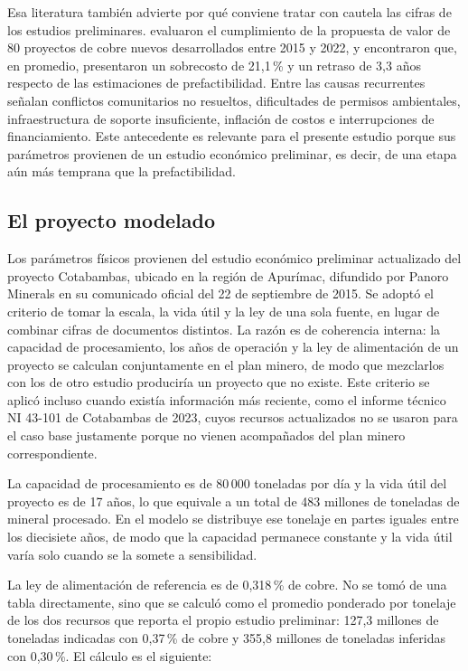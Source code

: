 Esa literatura también advierte por qué conviene tratar con cautela las cifras de los
estudios preliminares. \textcite{lagos2026} evaluaron el cumplimiento de la propuesta
de valor de 80 proyectos de cobre nuevos desarrollados entre 2015 y 2022, y
encontraron que, en promedio, presentaron un sobrecosto de 21,1\,\% y un retraso de
3,3 años respecto de las estimaciones de prefactibilidad. Entre las causas recurrentes
señalan conflictos comunitarios no resueltos, dificultades de permisos ambientales,
infraestructura de soporte insuficiente, inflación de costos e interrupciones de
financiamiento. Este antecedente es relevante para el presente estudio porque sus
parámetros provienen de un estudio económico preliminar, es decir, de una etapa aún
más temprana que la prefactibilidad.

\subsection{El proyecto modelado}

Los parámetros físicos provienen del estudio económico preliminar actualizado del
proyecto Cotabambas, ubicado en la región de Apurímac, difundido por Panoro
Minerals en su comunicado oficial del 22 de septiembre de 2015. Se adoptó el
criterio de tomar la escala, la vida útil y la ley de una sola fuente, en lugar de
combinar cifras de documentos distintos. La razón es de coherencia interna: la
capacidad de procesamiento, los años de operación y la ley de alimentación de un
proyecto se calculan conjuntamente en el plan minero, de modo que mezclarlos con
los de otro estudio produciría un proyecto que no existe. Este criterio se aplicó
incluso cuando existía información más reciente, como el informe técnico NI 43-101
de Cotabambas de 2023, cuyos recursos actualizados no se usaron para el caso base
justamente porque no vienen acompañados del plan minero correspondiente.

La capacidad de procesamiento es de 80\,000 toneladas por día y la vida útil del
proyecto es de 17 años, lo que equivale a un total de 483 millones de toneladas de
mineral procesado. En el modelo se distribuye ese tonelaje en partes iguales entre
los diecisiete años, de modo que la capacidad permanece constante y la vida útil
varía solo cuando se la somete a sensibilidad.

La ley de alimentación de referencia es de 0,318\,\% de cobre. No se tomó de una
tabla directamente, sino que se calculó como el promedio ponderado por tonelaje de
los dos recursos que reporta el propio estudio preliminar: 127,3 millones de
toneladas indicadas con 0,37\,\% de cobre y 355,8 millones de toneladas inferidas
con 0,30\,\%. El cálculo es el siguiente:

